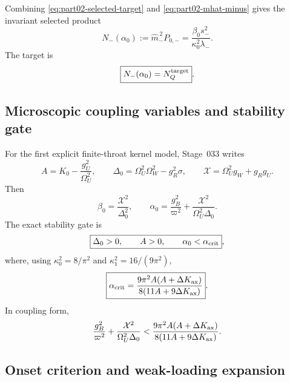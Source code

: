 Combining \eqref{eq:part02-selected-target} and \eqref{eq:part02-mhat-minus} gives the invariant selected product
\begin{equation}
\label{eq:part02-Nminus-alpha}
\boxed{
N_-(\alpha_0)
:=\widehat m_-^{\,2}P_{0,-}
=
\frac{\beta_0s_-^2}{\kappa_0^2\lambda_-}}.
\end{equation}
The target is
\begin{equation}
\label{eq:part02-Nminus-target-alpha}
\boxed{
N_-(\alpha_0)=N_Q^{\rm target}}.
\end{equation}

\subsection{Microscopic coupling variables and stability gate}
\label{subsec:part02-stage033-microscopic-couplings}

For the first explicit finite-throat kernel model, Stage~033 writes
\begin{equation}
\label{eq:part02-stage16-defs}
\boxed{
A=K_0-\frac{g_U^2}{\Omega_U^2},
\qquad
\Delta_0=\Omega_U^2\Omega_W^2-g_R^2\sigma,
\qquad
\mathcal{X}=\Omega_U^2g_W+g_Rg_U}.
\end{equation}
Then
\begin{equation}
\label{eq:part02-stage16-alpha-beta}
\boxed{
\beta_0=\frac{\mathcal{X}^2}{\Delta_0^2},
\qquad
\alpha_0=\frac{g_B^2}{\varpi^2}+\frac{\mathcal{X}^2}{\Omega_U^2\Delta_0}}.
\end{equation}
The exact stability gate is
\begin{equation}
\label{eq:part02-stage16-stability-gate}
\boxed{
\Delta_0>0,
\qquad
A>0,
\qquad
\alpha_0<\alpha_{\rm crit}},
\end{equation}
where, using \(\kappa_0^2=8/\pi^2\) and \(\kappa_1^2=16/(9\pi^2)\),
\begin{equation}
\label{eq:part02-stage16-alpha-crit}
\boxed{
\alpha_{\rm crit}
=
\frac{9\pi^2A(A+\Delta K_{\rm ax})}{8(11A+9\Delta K_{\rm ax})}}.
\end{equation}
In coupling form,
\begin{equation}
\label{eq:part02-stage16-stability-coupling}
\frac{g_B^2}{\varpi^2}+\frac{\mathcal{X}^2}{\Omega_U^2\Delta_0}
<
\frac{9\pi^2A(A+\Delta K_{\rm ax})}{8(11A+9\Delta K_{\rm ax})}.
\end{equation}

\subsection{Onset criterion and weak-loading expansion}
\label{subsec:part02-stage033-onset}

